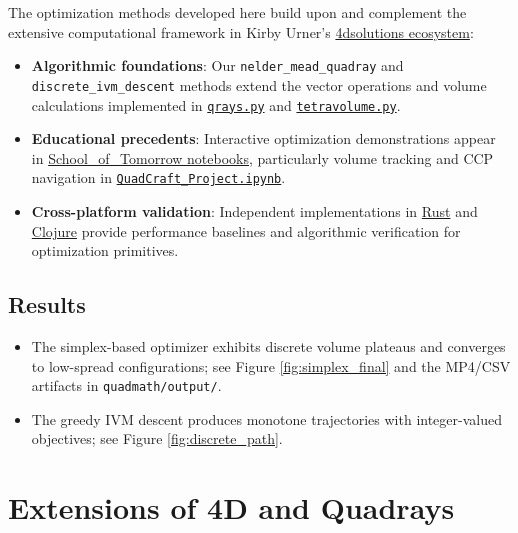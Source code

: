 \documentclass[
  10pt,
]{article}
\providecommand{\tightlist}{%
  \setlength{\itemsep}{0pt}\setlength{\parskip}{0pt}}
\begin{document}
The optimization methods developed here build upon and complement the
extensive computational framework in Kirby Urner's
\href{https://github.com/4dsolutions}{4dsolutions ecosystem}:

\begin{itemize}
\item
  \textbf{Algorithmic foundations}: Our \texttt{nelder\_mead\_quadray}
  and \texttt{discrete\_ivm\_descent} methods extend the vector
  operations and volume calculations implemented in
  \href{https://github.com/4dsolutions/m4w/blob/main/qrays.py}{\texttt{qrays.py}}
  and
  \href{https://github.com/4dsolutions/m4w/blob/main/tetravolume.py}{\texttt{tetravolume.py}}.
\item
  \textbf{Educational precedents}: Interactive optimization
  demonstrations appear in
  \href{https://github.com/4dsolutions/School_of_Tomorrow}{School\_of\_Tomorrow
  notebooks}, particularly volume tracking and CCP navigation in
  \href{https://github.com/4dsolutions/School_of_Tomorrow/blob/master/QuadCraft_Project.ipynb}{\texttt{QuadCraft\_Project.ipynb}}.
\item
  \textbf{Cross-platform validation}: Independent implementations in
  \href{https://github.com/4dsolutions/rusty_rays}{Rust} and
  \href{https://github.com/4dsolutions/synmods}{Clojure} provide
  performance baselines and algorithmic verification for optimization
  primitives.
\end{itemize}

\hypertarget{results}{%
\subsection{Results}\label{results}}

\begin{itemize}
\tightlist
\item
  The simplex-based optimizer exhibits discrete volume plateaus and
  converges to low-spread configurations; see Figure
  \ref{fig:simplex_final} and the MP4/CSV artifacts in
  \texttt{quadmath/output/}.
\item
  The greedy IVM descent produces monotone trajectories with
  integer-valued objectives; see Figure \ref{fig:discrete_path}. 
\end{itemize}

\hypertarget{extensions-of-4d-and-quadrays}{%
\section{Extensions of 4D and
Quadrays}\label{extensions-of-4d-and-quadrays}}
\end{document}

